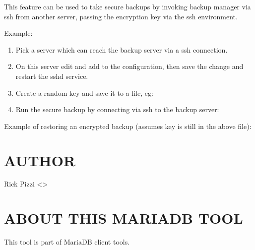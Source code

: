 \documentclass[letterpaper,10pt,english]{sphinxmanual}
\begin{document}
\sphinxAtStartPar
This feature can be used to take secure backups by invoking backup manager via ssh from another
server, passing the encryption key via the ssh environment.

\sphinxAtStartPar
Example:
\begin{enumerate}
%
\item {} 
\sphinxAtStartPar
Pick a server which can reach the backup server via a ssh connection.

\item {} 
\sphinxAtStartPar
On this server edit  and add  to the configuration,
then save the change and restart the sshd service.

\item {} 
\sphinxAtStartPar
Create a random key and save it to a file, eg:

\item {} 
\sphinxAtStartPar
Run the secure backup by connecting via ssh to the backup server:

\end{enumerate}

\sphinxAtStartPar
Example of restoring an encrypted backup (assumes key is still in the above file):
\begin{quote}

\sphinxAtStartPar
{}
\end{quote}


\section{AUTHOR}
\label{\detokenize{mariadb-backup-manager:author}}
\sphinxAtStartPar
Rick Pizzi \textless{}\textgreater{}


\section{ABOUT THIS MARIADB TOOL}
\label{\detokenize{mariadb-backup-manager:about-this-mariadb-tool}}
\sphinxAtStartPar
This tool is part of MariaDB client tools.
\end{document}
